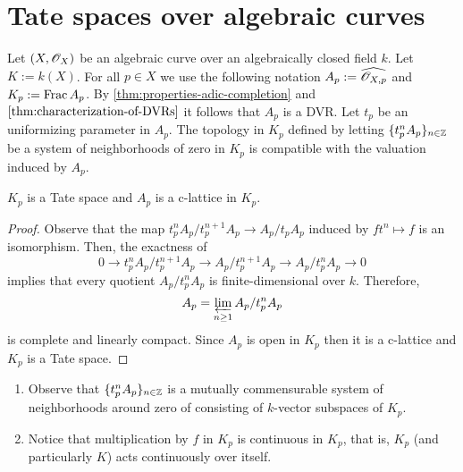 \section{Tate spaces over algebraic curves}
Let $(X,{\mathscr O}_{X})$ be an algebraic curve over an algebraically closed field $k$. Let $K := k(X)$. For all $p \in X$ we use the following notation $A_{p} := \widehat{{\mathscr O}_{X,p}}$ and $K_{p}:=\operatorname{Frac} A_{p}$. By \cref{thm:properties-adic-completion} and $\cref{thm:characterization-of-DVRs}$ it follows that $A_{p}$ is a DVR. Let $t_{p}$ be an uniformizing parameter in $A_{p}$. The topology in $K_{p}$ defined by letting $\{t_{p}^{n}A_{p}\}_{n\in {\mathbb Z}}$ be a system of neighborhoods of zero in $K_{p}$ is compatible with the valuation induced by $A_{p}$.
\begin{proposition}\label{prop:complete-fraction-field-is-a-Tate-space}
	$K_{p}$ is a Tate space and $A_{p}$ is a c-lattice in $K_{p}$.
\end{proposition}
\begin{proof}
	Observe that the map $t_{p}^{n}A_{p}/t_{p}^{n+1}A_{p} \to A_{p}/t_{p}A_{p}$ induced by $ft^{n}\mapsto f$ is an isomorphism. Then, the exactness of
	\[
		0 \to t_{p}^{n}A_{p}/t_{p}^{n+1}A_{p} \to A_{p}/t_{p}^{n+1}A_{p} \to A_{p}/t_{p}^{n}A_{p} \to 0
	\]
	implies that every quotient $A_{p}/t_{p}^{n}A_{p}$ is finite-dimensional over $k$. Therefore, 
	\[
		A_{p} = \varprojlim_{n\geq 1} A_{p}/t_{p}^{n}A_{p}
	\]
	is complete and linearly compact. Since $A_{p}$ is open in $K_{p}$ then it is a c-lattice and $K_{p}$ is a Tate space.
\end{proof}
\begin{remark}\label{rem:mutually-commensurable-system}
\begin{enumerate}[label = (\alph*)]
	\item Observe that $\{t_{p}^{n}A_{p}\}_{n\in {\mathbb Z}}$ is a mutually commensurable system of neighborhoods around zero of consisting of $k$-vector subspaces of $K_{p}$. 
	\item Notice that multiplication by $f$ in $K_{p}$ is continuous in $K_{p}$, that is, $K_{p}$ (and particularly $K$) acts continuously over itself.
\end{enumerate}
\end{remark}


